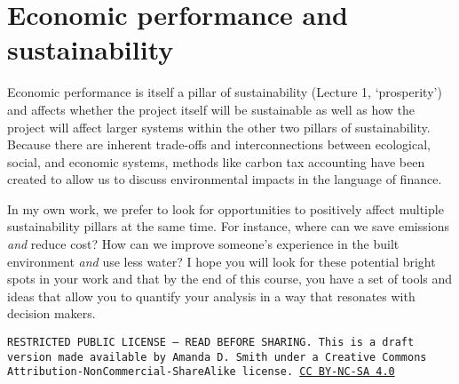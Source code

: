 \documentclass[10pt]{article}
\begin{document}
\section{Economic performance and sustainability}

   {}
\smallskip

Economic performance is itself a pillar of sustainability (Lecture 1, `prosperity') and affects whether the project itself will be sustainable as well as how the project will affect larger systems within the other two pillars of sustainability. Because there are inherent trade-offs and interconnections between ecological, social, and economic systems, methods like carbon tax accounting have been created to allow us to discuss environmental impacts in the language of finance.

In my own work, we prefer to look for opportunities to positively affect multiple sustainability pillars at the same time. For instance, where can we save emissions \textit{and} reduce cost? How can we improve someone's experience in the built environment \textit{and} use less water? I hope you will look for these potential bright spots in your work and that by the end of this course, you have a set of tools and ideas that allow you to quantify your analysis in a way that resonates with decision makers. 



\bigskip

\noindent
\texttt{\footnotesize RESTRICTED PUBLIC LICENSE --- READ BEFORE SHARING. This is a draft version made available by Amanda D. Smith under a Creative Commons Attribution-NonCommercial-ShareAlike license. 
\href{https://creativecommons.org/licenses/by-nc-sa/4.0/}{CC BY-NC-SA 4.0}}


\printbibliography
\end{document}
